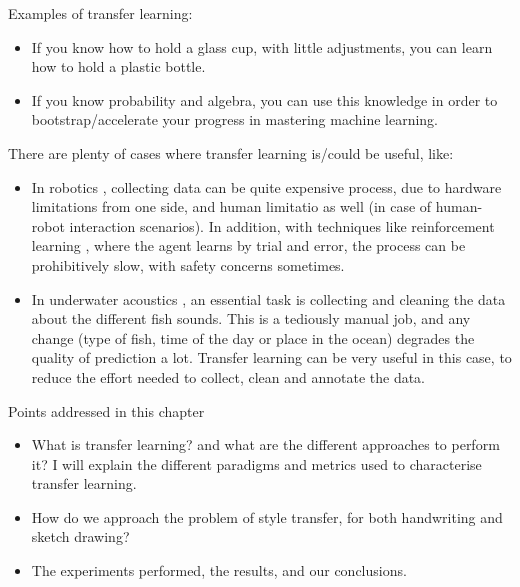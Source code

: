 
  \par Examples of transfer learning:
  \begin{itemize}
      \item If you know how to hold a glass cup, with little adjustments, you can learn how to hold a plastic bottle.
      \item If you know probability and algebra, you can use this knowledge in order to bootstrap/accelerate your progress in mastering machine learning.
  \end{itemize}

  \par There are plenty of cases where transfer learning is/could be useful, like:
  \begin{itemize}
    \item In robotics \citep{konidaris2012robot,Konidaris:2012:TRL:2188385.2343689}, collecting data can be quite expensive process, due to hardware limitations from one side, and human limitatio as well (in case of human-robot interaction scenarios). In addition, with techniques like reinforcement learning \citep{sutton2018reinforcement}, where the agent learns by trial and error, the process can be prohibitively slow, with safety concerns sometimes.
    \item In underwater acoustics \citep{malfante2018automatic}, an essential task is collecting and cleaning the data about the different fish sounds. This is a tediously manual job, and any change (type of fish, time of the day or place in the ocean) degrades the quality of prediction a lot. Transfer learning can be very useful in this case, to reduce the effort needed to collect, clean and annotate the data.
  \end{itemize}

  \begin{mdframed}[backgroundcolor=blue!20]
      \begin{center}
          Points addressed in this chapter
      \end{center}

      \begin{itemize}
          \item What is transfer learning? and what are the different approaches to perform it? I will explain the different paradigms and metrics used to characterise transfer learning.
          \item How do we approach the problem of style transfer, for both handwriting and sketch drawing?
          \item The experiments performed, the results, and our conclusions.
      \end{itemize}
  \end{mdframed}

